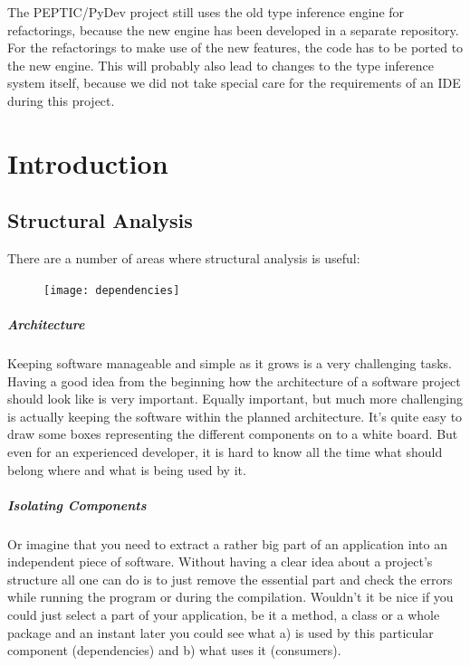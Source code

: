 \documentclass[12pt,halfparskip,DIV11,BCOR10mm]{scrreprt}
\begin{document}
The PEPTIC/PyDev project still uses the old type inference engine for refactorings, because the new engine has been developed in a separate repository. For the refactorings to make use of the new features, the code has to be ported to the new engine. This will probably also lead to changes to the type inference system itself, because we did not take special care for the requirements of an IDE during this project.

\newpage

\tableofcontents

\newpage
{}
\pagestyle{scrheadings}

\chapter{Introduction}

\section{Structural Analysis}

There are a number of areas where structural analysis is useful:

\begin{figure}
    \vspace{-0.3cm}
    \texttt{[image: dependencies]}
    \vspace{-1cm}
\end{figure}

\paragraph{Architecture}
Keeping software manageable and simple as it grows is a very challenging tasks. Having a good idea from the beginning how the architecture of a software project should look like is very important. Equally important, but much more challenging is actually keeping the software within the planned architecture. It's quite easy to draw some boxes representing the different components on to a white board. But even for an experienced developer, it is hard to know all the time what should belong where and what is being used by it.

\paragraph{Isolating Components}
Or imagine that you need to extract a rather big part of an application into an independent piece of software. Without having a clear idea about a project's structure all one can do is to just remove the essential part and check the errors while running the program or during the compilation. Wouldn't it be nice if you could just select a part of your application, be it a method, a class or a whole package and an instant later you could see what a) is used by this particular component (dependencies) and b) what uses it (consumers).
\end{document}
